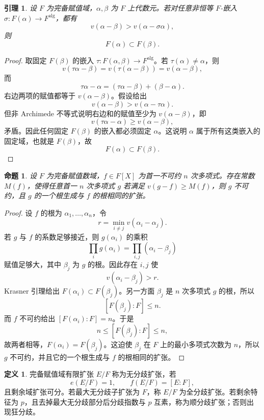 \documentclass[11pt,a4paper,openany]{ctexbook}
\numberwithin{equation}{chapter}
\theoremstyle{plain}
\newtheorem{proposition}[theorem]{命题}
\newtheorem{lemma}[theorem]{引理}
\theoremstyle{definition}
\newtheorem{definition}[theorem]{定义}
\theoremstyle{remark}
\begin{document}
\begin{lemma}
设 $F$ 为完备赋值域，$\alpha,\beta$ 为 $F$ 上代数元。若对任意非恒等 $F$-嵌入 $\sigma:F(\alpha)\to F^{\mathrm{alg}}$，都有
\[
v(\alpha-\beta)>v(\alpha-\sigma\alpha),
\]
则
\[
F(\alpha)\subset F(\beta).
\]
\end{lemma}

\begin{proof}
取固定 $F(\beta)$ 的嵌入 $\tau:F(\alpha,\beta)\to F^{\mathrm{alg}}$。若 $\tau(\alpha)\ne\alpha$，则
\[
v(\tau\alpha-\beta)=v(\tau(\alpha-\beta))=v(\alpha-\beta),
\]
而
\[
\tau\alpha-\alpha=(\tau\alpha-\beta)+(\beta-\alpha).
\]
右边两项的赋值都等于 $v(\alpha-\beta)$。假设给出
\[
v(\alpha-\beta)>v(\alpha-\tau\alpha).
\]
但非 Archimede 不等式说明右边和的赋值至少为
$v(\alpha-\beta)$，即
\[
v(\tau\alpha-\alpha)\ge v(\alpha-\beta),
\]
矛盾。因此任何固定 $F(\beta)$ 的嵌入都必须固定 $\alpha$。这说明
\(\alpha\) 属于所有这类嵌入的固定域，也就是 \(F(\beta)\)，故
\[
F(\alpha)\subset F(\beta).
\]
\end{proof}

\begin{proposition}
设 $F$ 为完备赋值数域，$f\in F[X]$ 为首一不可约 $n$ 次多项式。存在常数 $M(f)$，使得任意首一 $n$ 次多项式 $g$ 若满足 $v(g-f)\ge M(f)$，则 $g$ 不可约，且 $g$ 的一个根生成与 $f$ 的根相同的扩张。
\end{proposition}

\begin{proof}
设 $f$ 的根为 $\alpha_1,\dots,\alpha_n$，令
\[
r=\min_{i\ne j}v(\alpha_i-\alpha_j).
\]
若 $g$ 与 $f$ 的系数足够接近，则 $g(\alpha_i)$ 的乘积
\[
\prod_i g(\alpha_i)=\prod_{i,j}(\alpha_i-\beta_j)
\]
赋值足够大，其中 $\beta_j$ 为 $g$ 的根。因此存在 $i,j$ 使
\[
v(\alpha_i-\beta_j)>r.
\]
Krasner 引理给出 $F(\alpha_i)\subset F(\beta_j)$。另一方面
$\beta_j$ 是 $n$ 次多项式 $g$ 的根，所以
\[
[F(\beta_j):F]\le n.
\]
而 $f$ 不可约给出 $[F(\alpha_i):F]=n$。于是
\[
n\le [F(\beta_j):F]\le n,
\]
故两者相等，$F(\alpha_i)=F(\beta_j)$。这迫使 $\beta_j$ 在 $F$ 上的最小多项式次数为
$n$，所以 $g$ 不可约，并且它的一个根生成与 $f$ 的根相同的扩张。
\end{proof}

\begin{definition}
完备赋值域有限扩张 $E/F$ 称为无分歧扩张，若
\[
e(E/F)=1,\qquad f(E/F)=[E:F],
\]
且剩余域扩张可分。若最大无分歧子扩张为 $F$，称 $E/F$ 为全分歧扩张。若剩余特征为 $p$，且去掉最大无分歧部分后分歧指数与 $p$ 互素，称为顺分歧扩张；否则出现狂分歧。
\end{definition}
\end{document}

